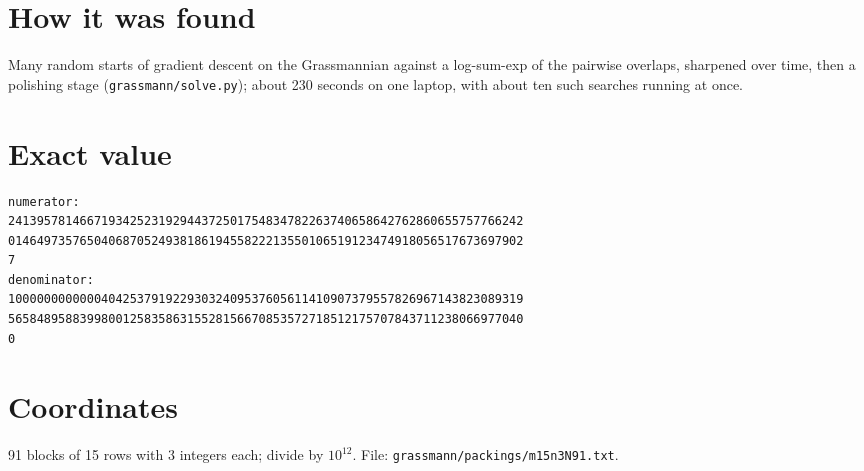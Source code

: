 \documentclass[11pt,a4paper]{article}
\begin{document}
\section{How it was found}
Many random starts of gradient descent on the Grassmannian against a log-sum-exp of the pairwise overlaps, sharpened over time, then a polishing stage (\texttt{grassmann/solve.py}); about 230 seconds on one laptop, with about ten such searches running at once.


\appendix
\section{Exact value}
{\small
\begin{verbatim}
numerator:
241395781466719342523192944372501754834782263740658642762860655757766242
014649735765040687052493818619455822213550106519123474918056517673697902
7
denominator:
100000000000040425379192293032409537605611410907379557826967143823089319
565848958839980012583586315528156670853572718512175707843711238066977040
0
\end{verbatim}}

\section{Coordinates}
91 blocks of 15 rows with 3 integers each; divide by $10^{12}$. File: \texttt{grassmann/packings/m15n3N91.txt}.
{\tiny
\begin{multicols}{3}
\end{multicols}}
\end{document}
